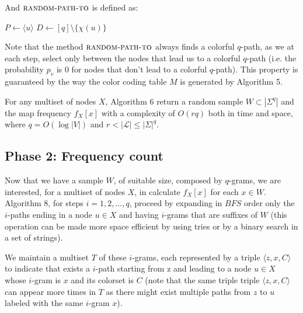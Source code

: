 And $\textsc{random-path-to}$ is defined as:

\begin{algorithm}[h]
	\small
	\DontPrintSemicolon
	$P\gets \langle u \rangle$\;
	$D\gets [q] \setminus \{\chi(u)\}$\;
	\caption{$\textsc{random-path-to}$}
	\label{alg:random-path-to}
\end{algorithm}

Note that the method $\textsc{random-path-to}$ always finds a colorful $q$-path, as we at each step, select only between the nodes that lead us to a colorful $q$-path (i.e. the probability $p_{v}$ is $0$ for nodes that don't lead to a colorful $q$-path). This property is guaranteed by the way the color coding table $M$ is generated by Algorithm 5.

\begin{lemma}
	For any multiset of nodes $X$, 
	Algorithm 6 return a random sample $W \subset |\Sigma^{q}|$ and the map frequency $f_{X}[x]$
	with a complexity of $O(rq)$ both in time and space, 
	where $q = O(\log |V|)$ and $r < |\mathcal{L}| \leq |\Sigma|^{q}$.
\end{lemma}

\clearpage
\subsection*{Phase 2: Frequency count}

Now that we have a sample $W$, of suitable size, composed by $q$-grams, we are interested, for a multiset of nodes $X$, in calculate $f_{X}[x]$ for each $x \in W$. Algorithm 8, for steps $i = 1, 2, \ldots, q$, proceed by expanding in $BFS$ order only the $i$-paths ending in a node $u \in X$ and having $i$-grams that are suffixes of $W$ (this operation can be made more space efficient by using tries or by a binary search in a set of strings).\medskip

We maintain a multiset $T$ of these $i$-grams, each represented by a triple $\langle z, x, C \rangle$ to indicate that exists a $i$-path starting from z and leading to a node $u \in X$ whose $i$-gram is $x$ and its colorset is $C$ (note that the same triple triple $\langle z, x, C \rangle$ can appear more times in $T$ as there might exist multiple paths from $z$ to $u$ labeled with the same $i$-gram $x$).\medskip

